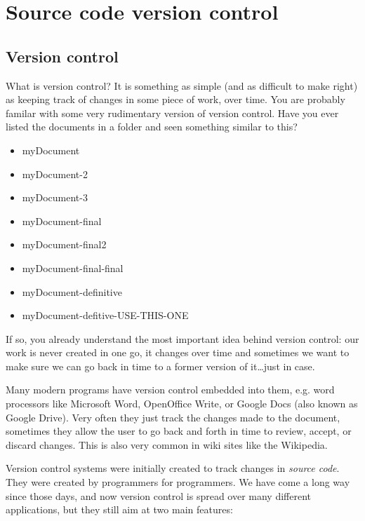 \chapter{Source code version control}
\label{sec:source-code-version}

\section{Version control}
\label{sec:version-control}

What is version control? It is something as simple (and as difficult
to make right) as keeping track of changes in some piece of work, over
time. You
are probably familar with some very rudimentary version of version
control. Have you ever listed the documents in a folder and seen
something similar to this?

\begin{itemize}
\item myDocument
\item myDocument-2
\item myDocument-3
\item myDocument-final
\item myDocument-final2
\item myDocument-final-final
\item myDocument-definitive
\item myDocument-defitive-USE-THIS-ONE
\end{itemize}

If so, you already understand the most important idea behind version
control: our work is never created in one go, it changes over time and
sometimes we want to make sure we can go back in time to a former
version of it\ldots just in case. 

Many modern programs have version control embedded into them,
e.g. word processors like Microsoft Word, OpenOffice Write, or Google
Docs (also known as Google Drive). Very often they just track the
changes made to the document, sometimes they allow the user to go back
and forth in time to review, accept, or discard changes. This is also
very common in wiki sites like the Wikipedia. 


Version control systems were initially created to track changes in
\emph{source code}. They were created by programmers for
programmers. We have come a long way since those days, and now version
control is spread over many different applications, but they still aim
at two main features: 

